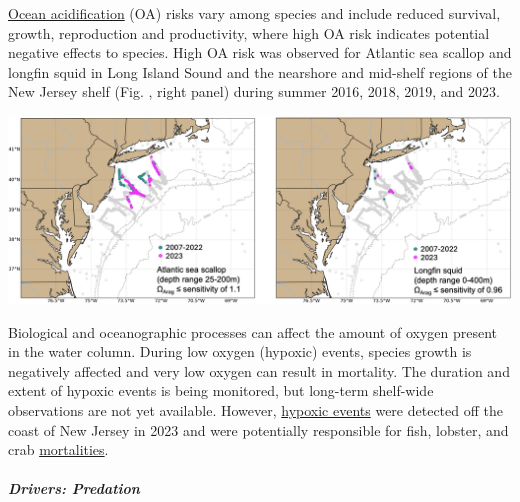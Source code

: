 \documentclass[
  10pt,
]{article}
\let\origfigure\figure
\let\endorigfigure\endfigure
\renewenvironment{figure}[1][2] {
    \expandafter\origfigure\expandafter[H]
} {
    \endorigfigure
}
\begin{document}
\href{https://noaa-edab.github.io/catalog/ocean-acidification-and-other-stressors.html}{Ocean acidification} (OA) risks vary among species and include reduced survival, growth, reproduction and productivity, where high OA risk indicates potential negative effects to species. High OA risk was observed for Atlantic sea scallop and longfin squid in Long Island Sound and the nearshore and mid-shelf regions of the New Jersey shelf (Fig. , right panel) during summer 2016, 2018, 2019, and 2023.

\begin{figure}

{\centering \includegraphics{SOE-NEFMC_files/figure-latex/oa-2023-1} 

}

\caption{Locations where bottom aragonite saturation state ($\Omega_{Arag}$; summer only: June-August) were at or below the laboratory-derived sensitivity level for Atlantic sea scallop (left panel) and longfin squid (right panel) for the time periods 2007-2022 (dark cyan) and 2023 only (magenta). Gray circles indicate locations where bottom $\Omega_{Arag}$ values were above the species specific sensitivity values.}\label{fig:oa-2023}
\end{figure}

Biological and oceanographic processes can affect the amount of oxygen present in the water column. During low oxygen (hypoxic) events, species growth is negatively affected and very low oxygen can result in mortality. The duration and extent of hypoxic events is being monitored, but long-term shelf-wide observations are not yet available. However, \href{https://noaa-edab.github.io/catalog/observation-synthesis.html}{hypoxic events} were detected off the coast of New Jersey in 2023 and were potentially responsible for fish, lobster, and crab \href{https://sebsnjaesnews.rutgers.edu/2023/12/rutgers-scientists-observe-unusual-ocean-conditions-possibly-linked-to-mortality-in-marine-life-off-new-jersey/}{mortalities}.

\hypertarget{drivers-predation}{%
\subparagraph{Drivers: Predation}\label{drivers-predation}}
\end{document}
